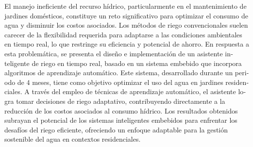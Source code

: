 \documentclass[pdflatex,sn-mathphys-num]{sn-jnl}%
\theoremstyle{thmstyleone}%
\theoremstyle{thmstyletwo}%
\theoremstyle{thmstylethree}%
\begin{document}
\begin{otherlanguage}{english}
\begin{minipage}[t]{0.6\textwidth}
\noindent
El manejo ineficiente del recurso hídrico, particularmente en el mantenimiento de jardines domésticos, constituye un reto significativo para optimizar el consumo de agua y disminuir los costos asociados. Los métodos de riego convencionales suelen carecer de la flexibilidad requerida para adaptarse a las condiciones ambientales en tiempo real, lo que restringe su eficiencia y potencial de ahorro. En respuesta a esta problemática, se presenta el diseño e implementación de un asistente inteligente de riego en tiempo real, basado en un sistema embebido que incorpora algoritmos de aprendizaje automático. Este sistema, desarrollado durante un periodo de 4 meses, tiene como objetivo optimizar el uso del agua en jardines residenciales. A través del empleo de técnicas de aprendizaje automático, el asistente logra tomar decisiones de riego adaptativo, contribuyendo directamente a la reducción de los costos asociados al consumo hídrico. Los resultados obtenidos subrayan el potencial de los sistemas inteligentes embebidos para enfrentar los desafíos del riego eficiente, ofreciendo un enfoque adaptable para la gestión sostenible del agua en contextos residenciales.

\end{minipage}

\end{otherlanguage}
\end{document}
